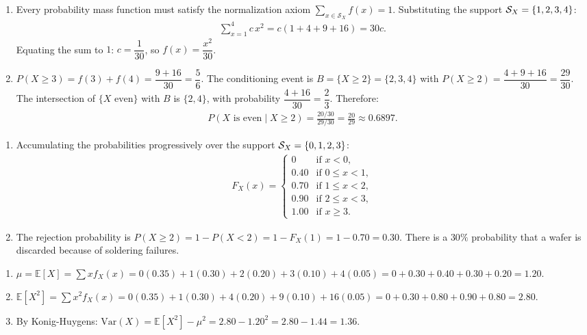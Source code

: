 \begin{solproblema}[prob:2c27c8e]
	\begin{enumerate}
		\item Every probability mass function must satisfy the normalization axiom $\sum_{x \in \mathcal{S}_X} f(x) = 1$. Substituting the support $\mathcal{S}_X = \left\{ 1, 2, 3, 4 \right\}$:
		\begin{align*}
			\sum_{x=1}^{4} c\, x^2 = c(1 + 4 + 9 + 16) = 30c.
		\end{align*}
		Equating the sum to $1$: $c = \dfrac{1}{30}$, so $f(x) = \dfrac{x^2}{30}$.
		\item $P(X \ge 3) = f(3) + f(4) = \dfrac{9+16}{30} = \dfrac{5}{6}$. The conditioning event is $B=\{X\ge2\}=\{2,3,4\}$ with $P(X\ge2)=\dfrac{4+9+16}{30}=\dfrac{29}{30}$. The intersection of $\{X \text{ even}\}$ with $B$ is $\{2,4\}$, with probability $\dfrac{4+16}{30}=\dfrac{2}{3}$. Therefore:
		\begin{align*}
			P(X \text{ is even} \mid X \ge 2) = \frac{20/30}{29/30} = \frac{20}{29} \approx 0.6897.
		\end{align*}
	\end{enumerate}
\end{solproblema}

\begin{solproblema}
	\begin{enumerate}
		\item Accumulating the probabilities progressively over the support $\mathcal{S}_X = \left\{ 0,1,2,3 \right\}$:
		\begin{align*}
			F_X(x) = \begin{cases}
				0 & \text{if } x < 0, \\
				0.40 & \text{if } 0 \le x < 1, \\
				0.70 & \text{if } 1 \le x < 2, \\
				0.90 & \text{if } 2 \le x < 3, \\
				1.00 & \text{if } x \ge 3.
			\end{cases}
		\end{align*}
		\item The rejection probability is $P(X \ge 2) = 1 - P(X < 2) = 1 - F_X(1) = 1 - 0.70 = 0.30$. There is a $30\%$ probability that a wafer is discarded because of soldering failures.
	\end{enumerate}
\end{solproblema}

\begin{solproblema}[prob:c324c4f]
	\begin{enumerate}
		\item $\mu = \mathbb{E}[X] = \sum x f_X(x) = 0(0.35)+1(0.30)+2(0.20)+3(0.10)+4(0.05) = 0+0.30+0.40+0.30+0.20 = 1.20$.
		\item $\mathbb{E}[X^2] = \sum x^2 f_X(x) = 0(0.35)+1(0.30)+4(0.20)+9(0.10)+16(0.05) = 0+0.30+0.80+0.90+0.80 = 2.80$.
		\item By Konig-Huygens: $\text{Var}(X) = \mathbb{E}[X^2] - \mu^2 = 2.80 - 1.20^2 = 2.80 - 1.44 = 1.36$.
	\end{enumerate}
\end{solproblema}

